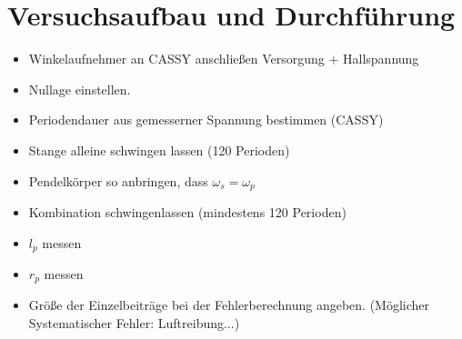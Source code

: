 \documentclass[a4paper,12pt]{scrartcl}
\begin{document}
\section{Versuchsaufbau und Durchführung}
\begin{itemize}
\item Winkelaufnehmer an CASSY anschließen Versorgung + Hallspannung
\item Nullage einstellen.
\item Periodendauer aus gemesserner Spannung bestimmen (CASSY)
\item Stange alleine schwingen lassen (120 Perioden)
\item Pendelkörper so anbringen, dass $\omega_s=\omega_p$ 
\item Kombination schwingenlassen (mindestens 120 Perioden)
\item $l_p$ messen
\item $r_p$ messen
\item Größe der Einzelbeiträge bei der Fehlerberechnung angeben. (Möglicher Systematischer Fehler: Luftreibung...)
\end{itemize}
\end{document}
